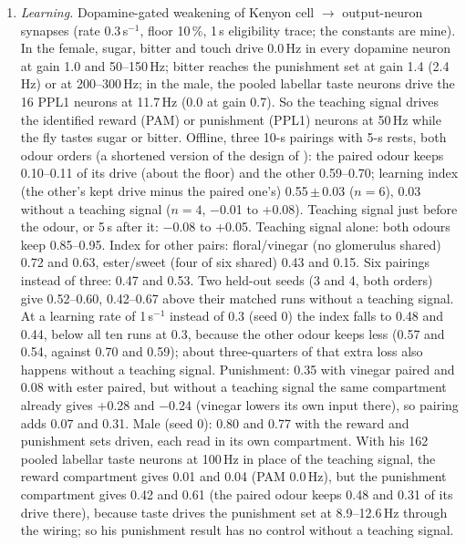 \begin{enumerate}[leftmargin=*, label=\arabic*., itemsep=4pt]
Touch $\rightarrow$ DNp13 is 36.0\,$\pm$\,0.8\,Hz without a state and 36.1\,$\pm$\,0.7 with SAG. At gain 1.4 SAG lowers it from 41.9 to 37.9\,Hz (5 seeds; $p=0.04$). With the state neurons driven at 100\,Hz, SAG lowers it from 35.6\,$\pm$\,1.0 to 32.3\,$\pm$\,1.4\,Hz (5 seeds; Welch $p=0.004$, which meets the rule set in advance for qualifying this miss) and pC1a--c to 28.3\,$\pm$\,1.4\,Hz ($p=2\times10^{-5}$), while no other state lowers it by more than 0.9\,Hz. At 10--60\,Hz neither moves touch alone by more than 1.5\,Hz ($p\geq0.12$); with cVA added, at 60\,Hz, they lower it by 2.2 and 4.2\,Hz ($p=0.04$ and 0.05). oviDN is 0 under every state, at every gain and state rate.

\item \emph{Learning.} Dopamine-gated weakening of Kenyon cell $\rightarrow$ output-neuron synapses (rate 0.3\,s$^{-1}$, floor 10\,\%, 1\,s eligibility trace; the constants are mine). In the female, sugar, bitter and touch drive 0.0\,Hz in every dopamine neuron at gain 1.0 and 50--150\,Hz; bitter reaches the punishment set at gain 1.4 (2.4\,Hz) or at 200--300\,Hz; in the male, the pooled labellar taste neurons drive the 16 PPL1 neurons at 11.7\,Hz (0.0 at gain 0.7). So the teaching signal drives the identified reward (PAM) or punishment (PPL1) neurons at 50\,Hz while the fly tastes sugar or bitter. Offline, three 10-s pairings with 5-s rests, both odour orders (a shortened version of the design of \citealt{tully1985classical}): the paired odour keeps 0.10--0.11 of its drive (about the floor) and the other 0.59--0.70; learning index (the other's kept drive minus the paired one's) 0.55\,$\pm$\,0.03 ($n=6$), 0.03 without a teaching signal ($n=4$, $-$0.01 to +0.08). Teaching signal just before the odour, or 5\,s after it: $-$0.08 to +0.05. Teaching signal alone: both odours keep 0.85--0.95. Index for other pairs: floral/vinegar (no glomerulus shared) 0.72 and 0.63, ester/sweet (four of six shared) 0.43 and 0.15. Six pairings instead of three: 0.47 and 0.53. Two held-out seeds (3 and 4, both orders) give 0.52--0.60, 0.42--0.67 above their matched runs without a teaching signal. At a learning rate of 1\,s$^{-1}$ instead of 0.3 (seed 0) the index falls to 0.48 and 0.44, below all ten runs at 0.3, because the other odour keeps less (0.57 and 0.54, against 0.70 and 0.59); about three-quarters of that extra loss also happens without a teaching signal.
Punishment: 0.35 with vinegar paired and 0.08 with ester paired, but without a teaching signal the same compartment already gives +0.28 and $-$0.24 (vinegar lowers its own input there), so pairing adds 0.07 and 0.31. Male (seed 0): 0.80 and 0.77 with the reward and punishment sets driven, each read in its own compartment. With his 162 pooled labellar taste neurons at 100\,Hz in place of the teaching signal, the reward compartment gives 0.01 and 0.04 (PAM 0.0\,Hz), but the punishment compartment gives 0.42 and 0.61 (the paired odour keeps 0.48 and 0.31 of its drive there), because taste drives the punishment set at 8.9--12.6\,Hz through the wiring; so his punishment result has no control without a teaching signal.

\end{enumerate}
